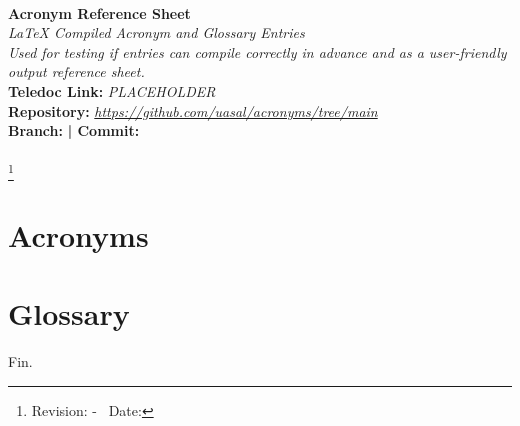\documentclass[12pt]{book}
\def\title{Acronym Reference Sheet}
\def\subtitle{LaTeX Compiled Acronym and Glossary Entries}
\def\info{Used for testing if entries can compile correctly in advance and as a user-friendly output reference sheet.}
\def\repourl{\url{https://github.com/uasal/acronyms/tree/main}}
\def\teledoc{PLACEHOLDER}
\edef\gitBranch{\gitBranch}
\begin{document}
    \renewcommand{\maketitle}{
	\pagestyle{empty}
	\thispagestyle{empty}
	\begin{center}
		\vspace{0.5cm} \mbox{}\hrulefill \mbox{}\\[1cm]
     		{\Huge \textbf{\title}\\[1cm]}
     			{\Large \textit{\subtitle}}\\[3cm]
			{\large \textit{\info}}\\[5cm]
			{\small \textbf{Teledoc Link: }\textit{\teledoc}}\\[0.3cm]
            		{\small \textbf{Repository: }\textit{\repourl}}\\[0.5cm]
			{\small \textbf{Branch: } \gitBranch}
			{\small \textbf{  |  Commit:} \gitDescribe}\\[0.5cm]
     		{\small \mbox{}\hrulefill\mbox{}\\[10mm]}
            \footnote{{ Revision: \gitAbbrevHash - \gitDirty\ Date: \gitCommitterDate}}
  	\end{center}
	\pagestyle{fancy}
}

\maketitle

\setcounter{secnumdepth}{4}
\setcounter{tocdepth}{2}
\tableofcontents
	

\glsaddall
\chapter{Acronyms}
\printglossary[type=\acronymtype]
\chapter{Glossary}
\printglossary[type=term]

Fin.
\end{document}
